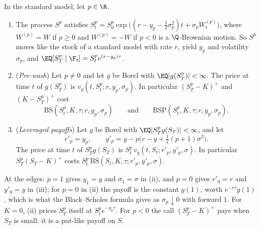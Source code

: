 \begin{proposition}\label{prop:sr-power}
In the standard model, let $p\in\R$.
\begin{enumerate}[label=(\roman*)]
  \item The process $S^p$ satisfies $S^p_t=S_0^p\exp\big((r-y_p-\frac12\sigma_p^2)t+\sigma_pW^{(p)}_t\big)$, where
    $W^{(p)}=W$ if $p\ge0$ and $W^{(p)}=-W$ if $p<0$ is a $\Q$-Brownian motion. So $S^p$ moves like the
    stock of a standard model with rate $r$, yield $y_p$ and volatility $\sigma_p$, and
    $\EQ[S^p_T\mid\F_t]=S^p_te^{(r-y_p)\tau}$.
  \item (\emph{Pre-wash}) Let $p\ne0$ and let $g$ be Borel with $\EQ|g(S_T^p)|<\infty$. The price at time $t$ of
    $g(S_T^p)$ is $v_g(t,S_t^p;r,y_p,\sigma_p)$. In particular $(S^p_T-K)^+$ and $(K-S^p_T)^+$ cost
    \[
      \mathrm{BS}(S_t^p,K,\tau;r,y_p,\sigma_p)\qquad\text{and}\qquad \mathrm{BSP}(S_t^p,K,\tau;r,y_p,\sigma_p).
    \]
  \item (\emph{Leveraged payoffs}) Let $g$ be Borel with $\EQ|S_T^pg(S_T)|<\infty$, and let
    \begin{equation}\label{eq:sr-leveraged}
      r'_p=y_p,\qquad y'_p=y-p\big(r-y+\tfrac12(p+1)\sigma^2\big).
    \end{equation}
    The price at time $t$ of $S_T^pg(S_T)$ is $S_t^p\,v_g(t,S_t;r'_p,y'_p,\sigma)$. In particular $S_T^p(S_T-K)^+$
    costs $S_t^p\,\mathrm{BS}(S_t,K,\tau;r'_p,y'_p,\sigma)$.
\end{enumerate}
At the edges: $p=1$ gives $y_1=y$ and $\sigma_1=\sigma$ in (ii), and $p=0$ gives $r'_0=r$ and $y'_0=y$ in (iii);
for $p=0$ in (ii) the payoff is the constant $g(1)$, worth $e^{-r\tau}g(1)$, which is what the
Black--Scholes formula gives as $\sigma_p\downarrow0$ with forward $1$. For $K=0$, (ii) prices $S_T^p$ itself
at $S_t^pe^{-y_p\tau}$. For $p<0$ the call $(S_T^p-K)^+$ pays when $S_T$ is small: it is a put-like payoff on
$S$.
\end{proposition}

